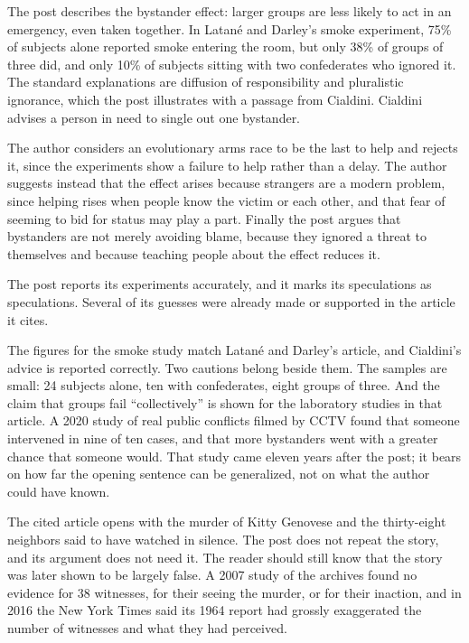\begin{afterword}
\summaryhead

The post describes the bystander effect: larger groups are less likely to act in an emergency, even taken together. In Latané and Darley's smoke experiment, 75\% of subjects alone reported smoke entering the room, but only 38\% of groups of three did, and only 10\% of subjects sitting with two confederates who ignored it. The standard explanations are diffusion of responsibility and pluralistic ignorance, which the post illustrates with a passage from Cialdini. Cialdini advises a person in need to single out one bystander.

The author considers an evolutionary arms race to be the last to help and rejects it, since the experiments show a failure to help rather than a delay. The author suggests instead that the effect arises because strangers are a modern problem, since helping rises when people know the victim or each other, and that fear of seeming to bid for status may play a part. Finally the post argues that bystanders are not merely avoiding blame, because they ignored a threat to themselves and because teaching people about the effect reduces it.

\responsehead

The post reports its experiments accurately, and it marks its speculations as speculations. Several of its guesses were already made or supported in the article it cites.

The figures for the smoke study match Latané and Darley's article, and Cialdini's advice is reported correctly. Two cautions belong beside them. The samples are small: 24 subjects alone, ten with confederates, eight groups of three. And the claim that groups fail ``collectively'' is shown for the laboratory studies in that article. A 2020 study of real public conflicts filmed by CCTV found that someone intervened in nine of ten cases, and that more bystanders went with a greater chance that someone would. That study came eleven years after the post; it bears on how far the opening sentence can be generalized, not on what the author could have known.

The cited article opens with the murder of Kitty Genovese and the thirty-eight neighbors said to have watched in silence. The post does not repeat the story, and its argument does not need it. The reader should still know that the story was later shown to be largely false. A 2007 study of the archives found no evidence for 38 witnesses, for their seeing the murder, or for their inaction, and in 2016 the New York Times said its 1964 report had grossly exaggerated the number of witnesses and what they had perceived.


\end{afterword}
